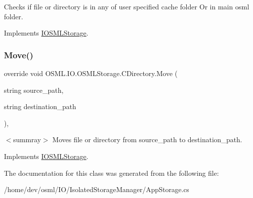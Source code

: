 Checks if file or directory is in any of user specified cache folder Or in main osml folder. 



Implements \mbox{\hyperlink{classIOSMLStorage_af3e0ef9f76c9739c3e685b1295cdf90a}{I\+O\+S\+M\+L\+Storage}}.

\mbox{\label{classOSML_1_1IO_1_1OSMLStorage_1_1CDirectory_a3cfadd280f91bf0b01e4ef9114d9499d}} 
\subsubsection{\texorpdfstring{Move()}{Move()}}
{\footnotesize\ttfamily override void O\+S\+M\+L.\+I\+O.\+O\+S\+M\+L\+Storage.\+C\+Directory.\+Move (\begin{DoxyParamCaption}\item[{string}]{source\+\_\+path,  }\item[{string}]{destination\+\_\+path }\end{DoxyParamCaption})\hspace{0.3cm}{\ttfamily [inline]}, {\ttfamily [virtual]}}





$<$summray$>$ Moves file or directory from source\+\_\+path to destination\+\_\+path. 

Implements \mbox{\hyperlink{classIOSMLStorage_a8646a392bda2184f21ae3439d67240a5}{I\+O\+S\+M\+L\+Storage}}.



The documentation for this class was generated from the following file\+:\begin{DoxyCompactItemize}
\item 
/home/dev/osml/\+I\+O/\+Isolated\+Storage\+Manager/App\+Storage.\+cs\end{DoxyCompactItemize}
